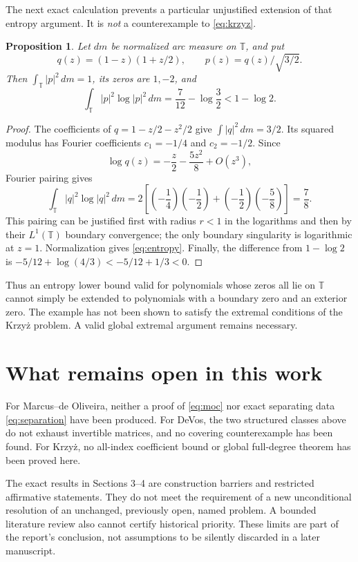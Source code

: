 \documentclass[11pt,a4paper]{article}
\newtheorem{proposition}[theorem]{Proposition}
\newcommand{\T}{\mathbb T}
\begin{document}
The next exact calculation prevents a particular unjustified extension
of that entropy argument. It is \emph{not} a counterexample to
\eqref{eq:krzyz}.

\begin{proposition}\label{prop:entropy}
Let $dm$ be normalized arc measure on $\T$, and put
\[
 q(z)=(1-z)(1+z/2),\qquad p(z)=q(z)/\sqrt{3/2}.
\]
Then $\int_{\T}|p|^2\,dm=1$, its zeros are $1,-2$, and
\begin{equation}\label{eq:entropy}
 \int_{\T}|p|^2\log|p|^2\,dm
   =\frac7{12}-\log\frac32
   <1-\log2.
\end{equation}
\end{proposition}
\begin{proof}
The coefficients of $q=1-z/2-z^2/2$ give
$\int|q|^2\,dm=3/2$. Its squared modulus has Fourier coefficients
$c_1=-1/4$ and $c_2=-1/2$. Since
\[
 \log q(z)=-\frac z2-\frac{5z^2}{8}+O(z^3),
\]
Fourier pairing gives
\[
 \int_{\T}|q|^2\log|q|^2\,dm
 =2\left[\left(-\frac14\right)\left(-\frac12\right)
          +\left(-\frac12\right)\left(-\frac58\right)\right]
 =\frac78.
\]
This pairing can be justified first with radius $r<1$ in the logarithms
and then by their $L^1(\T)$ boundary convergence; the only boundary
singularity is logarithmic at $z=1$. Normalization gives
\eqref{eq:entropy}. Finally, the difference from $1-\log2$ is
$-5/12+\log(4/3)<-5/12+1/3<0$.
\end{proof}

Thus an entropy lower bound valid for polynomials whose zeros all lie
on $\T$ cannot simply be extended to polynomials with a boundary zero
and an exterior zero. The example has not been shown to satisfy the
extremal conditions of the Krzy\.{z} problem. A valid global extremal
argument remains necessary.

\section{What remains open in this work}

For Marcus--de Oliveira, neither a proof of \eqref{eq:moc} nor exact
separating data \eqref{eq:separation} have been produced. For DeVos,
the two structured classes above do not exhaust invertible matrices,
and no covering counterexample has been found. For Krzy\.{z}, no
all-index coefficient bound or global full-degree theorem has been
proved here.

The exact results in Sections 3--4 are construction barriers and
restricted affirmative statements. They do not meet the requirement
of a new unconditional resolution of an unchanged, previously open,
named problem. A bounded literature review also cannot certify
historical priority. These limits are part of the report's conclusion,
not assumptions to be silently discarded in a later manuscript.
\end{document}

